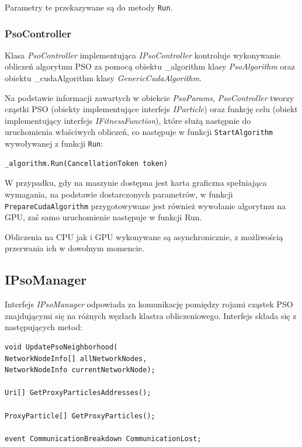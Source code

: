 \documentclass[12pt, twoside, openany, abstract=on]{report}
\theoremstyle{definition}
\begin{document}
Parametry te przekazywane są do metody \texttt{Run}.

\subsubsection{PsoController}
Klasa \textit{PsoController} implementująca \textit{IPsoController} kontroluje wykonywanie obliczeń algorytmu PSO za pomocą obiektu \_algorithm klasy \textit{PsoAlgorithm} oraz obiektu \_cudaAlgorithm klasy \textit{GenericCudaAlgorithm}. 

Na podstawie informacji zawartych w obiekcie \textit{PsoParams}, \textit{PsoController} tworzy cząstki PSO (obiekty implementujące interfejs \textit{IParticle}) oraz funkcję celu (obiekt implementujący interfejs \textit{IFitnessFunction}), które służą następnie do uruchomienia właściwych obliczeń, co następuje w funkcji \texttt{StartAlgorithm} wywoływanej z funkcji \texttt{Run}:

\lstset{style=sharpc}
\begin{lstlisting}[frame=single]
_algorithm.Run(CancellationToken token)
\end{lstlisting}

W przypadku, gdy na maszynie dostępna jest karta graficzna spełniająca wymagania, na podstawie dostarczonych parametrów, w funkcji \texttt{PrepareCudaAlgorithm} przygotowywane jest również wywołanie algorytmu na GPU, zaś samo uruchomienie następuje w funkcji Run.

Obliczenia na CPU jak i GPU wykonywane są asynchronicznie, z możliwością przerwania ich w dowolnym momencie.


\subsection{IPsoManager}

Interfejs \textit{IPsoManager} odpowiada za komunikację pomiędzy rojami cząstek PSO znajdującymi się na różnych węzłach klastra obliczeniowego. Interfejs składa się z następujących metod:

\lstset{style=sharpc}
\begin{lstlisting}[frame=single]
void UpdatePsoNeighborhood(
NetworkNodeInfo[] allNetworkNodes, 
NetworkNodeInfo currentNetworkNode);
  
Uri[] GetProxyParticlesAddresses();

ProxyParticle[] GetProxyParticles();

event CommunicationBreakdown CommunicationLost;
\end{lstlisting}
\end{document}
